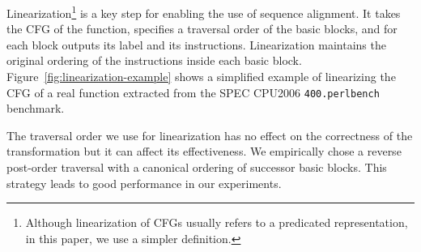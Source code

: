 Linearization\footnote{Although linearization of CFGs
usually refers to a predicated representation, %
in this paper, we use a simpler definition.} is a key step for enabling the use of sequence alignment. It takes the CFG of the function,
specifies a traversal order of the basic blocks, and for each block outputs its label and its instructions. Linearization
maintains the original ordering of the instructions inside each basic block.
Figure~\ref{fig:linearization-example} shows a simplified example of linearizing the CFG of a
real function extracted from the SPEC CPU2006 \texttt{400.perlbench} benchmark.



The traversal order we use for linearization has no effect on the correctness of the transformation
but it can affect its effectiveness. We empirically chose a reverse post-order traversal with a
canonical ordering of successor basic blocks.
This strategy leads to good performance in our experiments.


